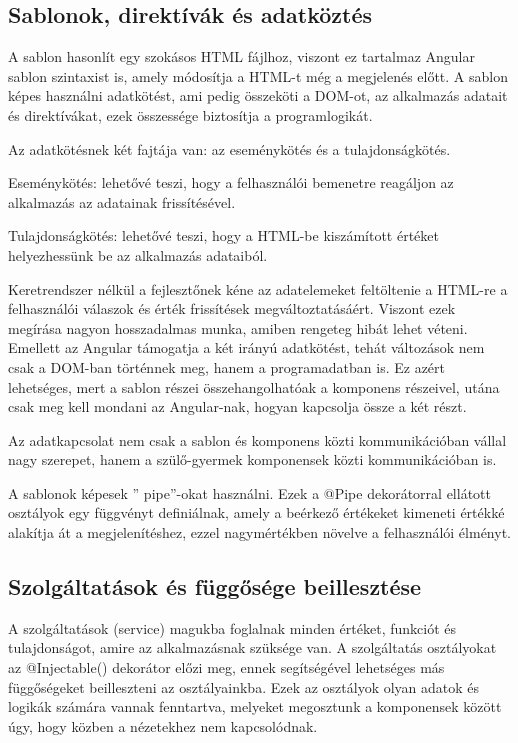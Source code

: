 \subsection{Sablonok, direktívák és adatköztés}
A sablon hasonlít egy szokásos HTML fájlhoz, viszont ez tartalmaz Angular sablon szintaxist is, amely módosítja a HTML-t még a megjelenés előtt. A sablon képes használni adatkötést, ami pedig összeköti a DOM-ot, az alkalmazás adatait és direktívákat, ezek összessége biztosítja a programlogikát. 

Az adatkötésnek két fajtája van: az eseménykötés és a tulajdonságkötés. 

Eseménykötés: lehetővé teszi, hogy a felhasználói bemenetre reagáljon az alkalmazás az adatainak frissítésével.

Tulajdonságkötés: lehetővé teszi, hogy a HTML-be kiszámított értéket helyezhessünk be az alkalmazás adataiból.

Keretrendszer nélkül a fejlesztőnek kéne az adatelemeket feltöltenie a HTML-re a felhasználói válaszok és érték frissítések megváltoztatásáért. Viszont ezek megírása nagyon hosszadalmas munka, amiben rengeteg hibát lehet véteni. Emellett az Angular támogatja a két irányú adatkötést, tehát változások nem csak a DOM-ban történnek meg, hanem a programadatban is. Ez azért lehetséges, mert a sablon részei összehangolhatóak a komponens részeivel, utána csak meg kell mondani az Angular-nak, hogyan kapcsolja össze a két részt.

Az adatkapcsolat nem csak a sablon és komponens közti kommunikációban vállal nagy szerepet, hanem a szülő-gyermek komponensek közti kommunikációban is.

A sablonok képesek ” pipe”-okat használni. Ezek a @Pipe dekorátorral ellátott osztályok egy függvényt definiálnak, amely a beérkező értékeket kimeneti értékké alakítja át a megjelenítéshez, ezzel nagymértékben növelve a felhasználói élményt.

\subsection{Szolgáltatások és függősége beillesztése}
A szolgáltatások (service) magukba foglalnak minden értéket, funkciót és tulajdonságot, amire az alkalmazásnak szüksége van. A szolgáltatás osztályokat az @Injectable() dekorátor előzi meg, ennek segítségével lehetséges más függőségeket beilleszteni az osztályainkba. Ezek az osztályok olyan adatok és logikák számára vannak fenntartva, melyeket megosztunk a komponensek között úgy, hogy közben a nézetekhez nem kapcsolódnak.

